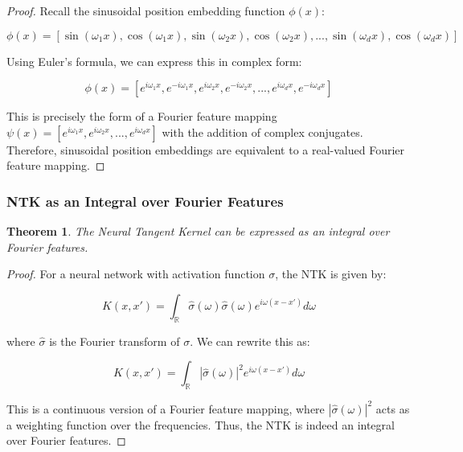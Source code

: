 \documentclass{article}
\newtheorem{theorem}{Theorem}
\begin{document}
\begin{proof}
Recall the sinusoidal position embedding function $\phi(x)$:

\begin{equation}
    \phi(x) = [\sin(\omega_1 x), \cos(\omega_1 x), \sin(\omega_2 x), \cos(\omega_2 x), ..., \sin(\omega_d x), \cos(\omega_d x)]
\end{equation}

Using Euler's formula, we can express this in complex form:

\begin{equation}
    \phi(x) = [e^{i\omega_1 x}, e^{-i\omega_1 x}, e^{i\omega_2 x}, e^{-i\omega_2 x}, ..., e^{i\omega_d x}, e^{-i\omega_d x}]
\end{equation}

This is precisely the form of a Fourier feature mapping $\psi(x) = [e^{i\omega_1 x}, e^{i\omega_2 x}, ..., e^{i\omega_d x}]$ with the addition of complex conjugates. Therefore, sinusoidal position embeddings are equivalent to a real-valued Fourier feature mapping.
\end{proof}

\subsubsection{NTK as an Integral over Fourier Features}

\begin{theorem}
The Neural Tangent Kernel can be expressed as an integral over Fourier features.
\end{theorem}

\begin{proof}
For a neural network with activation function $\sigma$, the NTK is given by:

\begin{equation}
    K(x, x') = \int_{\mathbb{R}} \hat{\sigma}(\omega) \hat{\sigma}(\omega) e^{i\omega(x-x')} d\omega
\end{equation}

where $\hat{\sigma}$ is the Fourier transform of $\sigma$. We can rewrite this as:

\begin{equation}
    K(x, x') = \int_{\mathbb{R}} |\hat{\sigma}(\omega)|^2 e^{i\omega(x-x')} d\omega
\end{equation}

This is a continuous version of a Fourier feature mapping, where $|\hat{\sigma}(\omega)|^2$ acts as a weighting function over the frequencies. Thus, the NTK is indeed an integral over Fourier features.
\end{proof}
\end{document}
